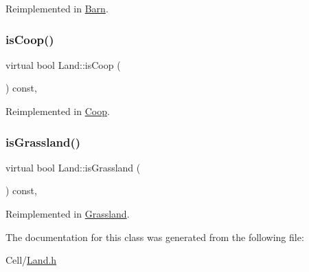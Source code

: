 Reimplemented in \mbox{\hyperlink{classBarn_a716f3e1ecf4d4d37fe934d29425841a1}{Barn}}.

\mbox{\label{classLand_a685f9ec0e771dbf0fe348dd13d467c4e}} 
\subsubsection{\texorpdfstring{isCoop()}{isCoop()}}
{\footnotesize\ttfamily virtual bool Land\+::is\+Coop (\begin{DoxyParamCaption}{ }\end{DoxyParamCaption}) const\hspace{0.3cm}{\ttfamily [inline]}, {\ttfamily [virtual]}}



Reimplemented in \mbox{\hyperlink{classCoop_af611b31347d3a8cf2304af22ecbfc450}{Coop}}.

\mbox{\label{classLand_aa79c16746d74c0493e66ce73f2fa0e0f}} 
\subsubsection{\texorpdfstring{isGrassland()}{isGrassland()}}
{\footnotesize\ttfamily virtual bool Land\+::is\+Grassland (\begin{DoxyParamCaption}{ }\end{DoxyParamCaption}) const\hspace{0.3cm}{\ttfamily [inline]}, {\ttfamily [virtual]}}



Reimplemented in \mbox{\hyperlink{classGrassland_ac4f00629f20061d2ec9f792a42f7315c}{Grassland}}.



The documentation for this class was generated from the following file\+:\begin{DoxyCompactItemize}
\item 
Cell/\mbox{\hyperlink{Land_8h}{Land.\+h}}\end{DoxyCompactItemize}
